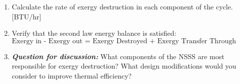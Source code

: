 \begin{fullwidth}
\begin{enumerate}[resume]
\vspace{1.0cm}
\item Calculate the rate of exergy destruction in each component of the cycle. [BTU/hr]

\vspace{1.0cm}

\item Verify that the second law energy balance is satisfied:
$$\text{Exergy in - Exergy out = Exergy Destroyed + Exergy Transfer Through Work}$$

\vspace{1.0cm}

\item \textbf{\emph{Question for discussion:}} What components of the NSSS are most responsible for exergy destruction?  What design modifications would you consider to improve thermal efficiency?
\end{enumerate}

\end{fullwidth}
